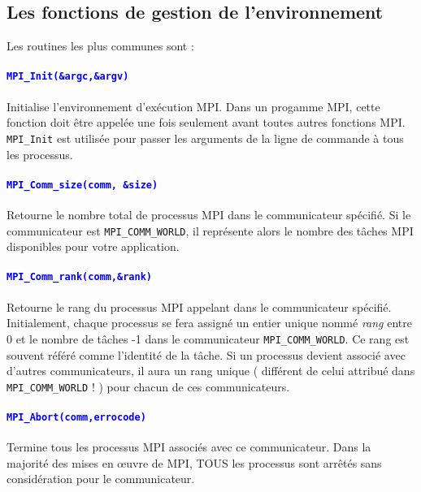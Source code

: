 \documentclass[11pt,a4paper]{article}
\begin{document}
\subsection{Les fonctions de gestion de l'environnement}

Les routines les plus communes sont :

\paragraph{\textcolor{blue}{\texttt{MPI\_Init(\&argc,\&argv)}}}

  Initialise l'environnement d'exécution MPI. Dans un progamme MPI, cette fonction doit être appelée une fois seulement avant toutes autres fonctions MPI. 
  \texttt{MPI\_Init} est utilisée pour passer les arguments de la ligne de commande à tous les processus.

\paragraph{\textcolor{blue}{\texttt{MPI\_Comm\_size(comm, \&size)}}}

  Retourne le nombre total de processus MPI dans le communicateur spécifié.
  Si le communicateur est \texttt{MPI\_COMM\_WORLD}, il représente alors le nombre des tâches MPI disponibles pour votre application.

\paragraph{\textcolor{blue}{\texttt{MPI\_Comm\_rank(comm,\&rank)}}}

  Retourne le rang du processus MPI appelant dans le communicateur spécifié. Initialement, chaque processus se fera
  assigné un entier unique nommé \textsl{rang} entre 0 et le nombre de tâches -1 dans le communicateur
  \texttt{MPI\_COMM\_WORLD}. Ce rang est souvent référé comme l'identité de la tâche. Si un processus devient
  associé avec d'autres communicateurs, il aura un rang unique ( différent de celui attribué dans
  \texttt{MPI\_COMM\_WORLD} ! ) pour chacun de ces communicateurs.

\paragraph{\textcolor{blue}{\texttt{MPI\_Abort(comm,errocode)}}}

  Termine tous les processus MPI associés avec ce communicateur. Dans la majorité des mises en {\oe}uvre de MPI,
  TOUS les processus sont arrêtés sans considération pour le communicateur.
\end{document}
